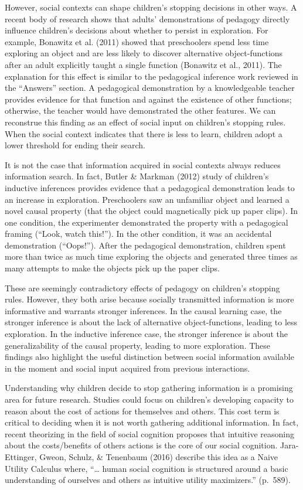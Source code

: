 \documentclass[oneside]{report}
\begin{document}
However, social contexts can shape children's stopping decisions in
other ways. A recent body of research shows that adults' demonstrations
of pedagogy directly influence children's decisions about whether to
persist in exploration. For example, Bonawitz et al. (2011) showed that
preschoolers spend less time exploring an object and are less likely to
discover alternative object-functions after an adult explicitly taught a
single function (Bonawitz et al., 2011). The explanation for this effect
is similar to the pedagogical inference work reviewed in the ``Answers''
section. A pedagogical demonstration by a knowledgeable teacher provides
evidence for that function and against the existence of other functions;
otherwise, the teacher would have demonstrated the other features. We
can reconstrue this finding as an effect of social input on children's
stopping rules. When the social context indicates that there is less to
learn, children adopt a lower threshold for ending their search.

It is not the case that information acquired in social contexts always
reduces information search. In fact, Butler \& Markman (2012) study of
children's inductive inferences provides evidence that a pedagogical
demonstration leads to an increase in exploration. Preschoolers saw an
unfamiliar object and learned a novel causal property (that the object
could magnetically pick up paper clips). In one condition, the
experimenter demonstrated the property with a pedagogical framing
(``Look, watch this!''). In the other condition, it was an accidental
demonstration (``Oops!''). After the pedagogical demonstration, children
spent more than twice as much time exploring the objects and generated
three times as many attempts to make the objects pick up the paper
clips.

These are seemingly contradictory effects of pedagogy on children's
stopping rules. However, they both arise because socially transmitted
information is more informative and warrants stronger inferences. In the
causal learning case, the stronger inference is about the lack of
alternative object-functions, leading to less exploration. In the
inductive inference case, the stronger inference is about the
generalizability of the causal property, leading to more exploration.
These findings also highlight the useful distinction between social
information available in the moment and social input acquired from
previous interactions.

Understanding why children decide to stop gathering information is a
promising area for future research. Studies could focus on children's
developing capacity to reason about the cost of actions for themselves
and others. This cost term is critical to deciding when it is not worth
gathering additional information. In fact, recent theorizing in the
field of social cognition proposes that intuitive reasoning about the
costs/benefits of others actions is the core of our social cognition.
Jara-Ettinger, Gweon, Schulz, \& Tenenbaum (2016) describe this idea as
a Naive Utility Calculus where, ``\ldots{} human social cognition is
structured around a basic understanding of ourselves and others as
intuitive utility maximizers.'' (p.~589).
\end{document}
